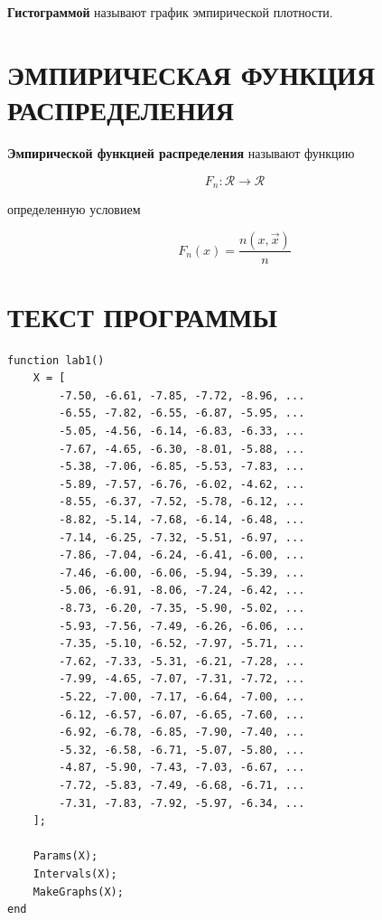 \textbf{Гистограммой} называют график эмпирической плотности.

\section{ЭМПИРИЧЕСКАЯ ФУНКЦИЯ РАСПРЕДЕЛЕНИЯ}

\textbf{Эмпирической функцией распределения} называют функцию

\begin{equation*}
    F_n : \mathcal R \to \mathcal R
\end{equation*}

определенную условием

\begin{equation*}
    F_n(x) = \frac{n(x, \vec x)}{n}
\end{equation*}

\section{ТЕКСТ ПРОГРАММЫ}

\begin{lstlisting}[caption=Точка входа в программу]
function lab1()
    X = [
        -7.50, -6.61, -7.85, -7.72, -8.96, ...
        -6.55, -7.82, -6.55, -6.87, -5.95, ...
        -5.05, -4.56, -6.14, -6.83, -6.33, ...
        -7.67, -4.65, -6.30, -8.01, -5.88, ...
        -5.38, -7.06, -6.85, -5.53, -7.83, ...
        -5.89, -7.57, -6.76, -6.02, -4.62, ...
        -8.55, -6.37, -7.52, -5.78, -6.12, ...
        -8.82, -5.14, -7.68, -6.14, -6.48, ...
        -7.14, -6.25, -7.32, -5.51, -6.97, ...
        -7.86, -7.04, -6.24, -6.41, -6.00, ...
        -7.46, -6.00, -6.06, -5.94, -5.39, ...
        -5.06, -6.91, -8.06, -7.24, -6.42, ...
        -8.73, -6.20, -7.35, -5.90, -5.02, ...
        -5.93, -7.56, -7.49, -6.26, -6.06, ...
        -7.35, -5.10, -6.52, -7.97, -5.71, ...
        -7.62, -7.33, -5.31, -6.21, -7.28, ...
        -7.99, -4.65, -7.07, -7.31, -7.72, ...
        -5.22, -7.00, -7.17, -6.64, -7.00, ...
        -6.12, -6.57, -6.07, -6.65, -7.60, ...
        -6.92, -6.78, -6.85, -7.90, -7.40, ...
        -5.32, -6.58, -6.71, -5.07, -5.80, ...
        -4.87, -5.90, -7.43, -7.03, -6.67, ...
        -7.72, -5.83, -7.49, -6.68, -6.71, ...
        -7.31, -7.83, -7.92, -5.97, -6.34, ...
    ];

    Params(X);
    Intervals(X);
    MakeGraphs(X);
end
\end{lstlisting}

